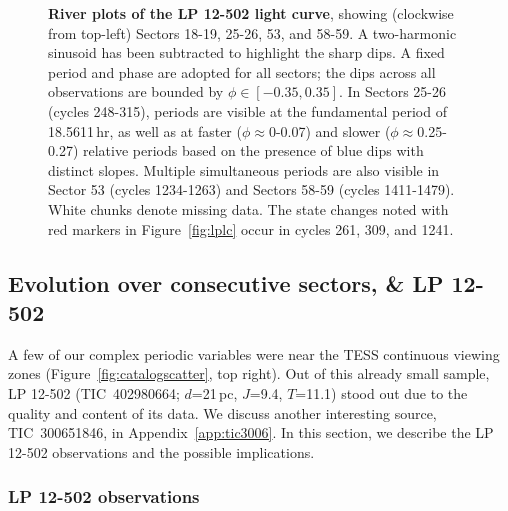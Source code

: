 \documentclass[11pt,twocolumn,tighten,linenumbers]{aastex63}
\begin{document}
\begin{figure*}[!t]
	\begin{center}
		\vspace{-0.2cm}
		
	\end{center}
	\vspace{-0.4cm}
	\caption{
    {\bf River plots of the LP 12-502 light curve}, showing (clockwise
    from top-left) Sectors 18-19, 25-26, 53, and 58-59.  A
    two-harmonic sinusoid has been subtracted to highlight the sharp
    dips.  A fixed period and phase are adopted for all sectors; the
    dips across all observations are bounded by $\phi \in
    [-0.35,0.35]$.  In Sectors 25-26 (cycles 248-315), periods are
    visible at the fundamental period of 18.5611\,hr, as well as at
    faster ($\phi$$\approx$0-0.07) and slower
    ($\phi$$\approx$0.25-0.27) relative periods based on the presence
    of blue dips with distinct slopes.  Multiple simultaneous periods
    are also visible in Sector 53 (cycles 1234-1263) and Sectors 58-59
    (cycles 1411-1479).  White chunks denote missing data.  The state
    changes noted with red markers in Figure~\ref{fig:lplc} occur in
    cycles 261, 309, and 1241.
	}
	\label{fig:lpriver0}
\end{figure*}


\subsection{Evolution over consecutive sectors, \& LP 12-502}

A few of our complex periodic variables were near the TESS continuous
viewing zones (Figure~\ref{fig:catalogscatter}, top right).  Out of
this already small sample, LP 12-502 (TIC~402980664; $d$=21\,pc,
$J$=9.4, $T$=11.1) stood out due to the quality and content of its
data.  We discuss another interesting source, TIC~300651846, in
Appendix~\ref{app:tic3006}.  In this section, we describe the LP
12-502 observations and the possible implications.


\subsubsection{LP 12-502 observations}
\label{subsec:lpobservations}
\end{document}
